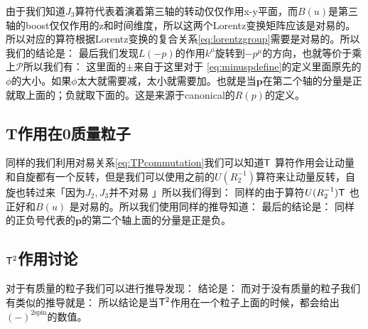 由于我们知道$ J_3 $算符代表着演着第三轴的转动仅仅作用x-y平面，而$ B(u) $是第三轴的boost仅仅作用的z和时间维度，所以这两个Lorentz变换矩阵应该是对易的。所以对应的算符根据Lorentz变换的复合关系\cref{eq:lorentzgroup}需要是对易的。所以我们的结论是：
最后我们发现$ L(-p) $的作用$ k^\mu $旋转到$ -p^\mu $的方向，也就等价于乘上$ \mathscr{P} $所以我们有：
这里面的$ \pm $来自于这里对于 \cref{eq:minuspdefine}的定义里面原先的$ \phi $的大小。如果$ \phi $太大就需要减，太小就需要加。也就是当$ \mathbf{p} $在第二个轴的分量是正就取上面的；负就取下面的。这是来源于canonical的$ R(p) $的定义。  


\subsection{T作用在0质量粒子}

同样的我们利用对易关系\cref{eq:TPcommutation}我们可以知道$ \mathsf{T} $ 算符作用会让动量和自旋都有一个反转，但是我们可以使用之前的$ U(R_2^{-1}) $算符来让动量反转，自旋也转过来「因为$ J_2,J_3 $并不对易 」所以我们得到：
同样的由于算符$ U(R_2^{-1})\mathsf{T} $ 也正好和$ B(u) $ 是对易的。所以我们使用同样的推导知道：
最后的结论是：
同样的正负号代表的$ \mathbf{p} $的第二个轴上面的分量是正是负。 


\subsection{$ \mathsf{T}^2 $作用讨论 }
对于有质量的粒子我们可以进行推导发现：
结论是：
而对于没有质量的粒子我们有类似的推导就是：
所以结论是当$ \mathsf{T}^2 $作用在一个粒子上面的时候，都会给出$ (-)^{2 \text{spin}} $的数值。

